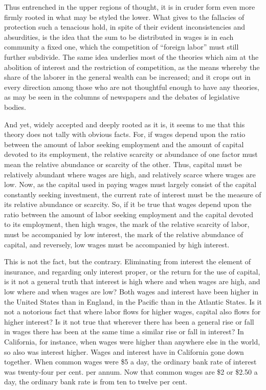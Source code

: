 Thus entrenched in the upper regions of thought, it is in cruder form
even more firmly rooted in what may be styled the lower. What gives to
the fallacies of protection such a tenacious hold, in spite of their
evident inconsistencies and absurdities, is the idea that the sum to be
distributed in wages is in each community a fixed one, which the
competition of ``foreign labor'' must still further subdivide. The same
idea underlies most of the theories which aim at the abolition of
interest and the restriction of competition, as the means whereby the
share of the laborer in the general wealth can be increased; and it
crops out in every direction among those who are not thoughtful enough
to have any theories, as may be seen in the columns of newspapers and
the debates of legislative bodies.

And yet, widely accepted and deeply rooted as it is, it seems to me that
this theory does not tally with obvious facts. For, if wages depend upon
the ratio between the amount of labor seeking employment and the amount
of capital devoted to its employment, the relative scarcity or abundance
of one factor must mean the relative abundance or scarcity of the other.
Thus, capital must be relatively abundant where wages are high, and
relatively scarce where wages are low. Now, as the capital used in
paying wages must largely consist of the capital constantly seeking
investment, the current rate of interest must be the measure of its
relative abundance or scarcity. So, if it be true that wages depend upon
the ratio between the amount of labor seeking employment and the capital
devoted to its employment, then high wages, the mark of the relative
scarcity of labor, must be accompanied by low interest, the mark of the
relative abundance of capital, and reversely, low wages must be
accompanied by high interest.

This is not the fact, but the contrary. Eliminating from interest the
element of insurance, and regarding only interest proper, or the return
for the use of capital, is it not a general truth that interest is high
where and when wages are high, and low where and when wages are low?
Both wages and interest have been higher in the United States than in
England, in the Pacific than in the Atlantic States. Is it not a
notorious fact that where labor flows for higher wages, capital also
flows for higher interest? Is it not true that wherever there has been a
general rise or fall in wages there has been at the same time a similar
rise or fall in interest? In California, for instance, when wages were
higher than anywhere else in the world, so also was interest higher.
Wages and interest have in California gone down together. When common
wages were \$5 a day, the ordinary bank rate of interest was twenty-four
per cent. per annum. Now that common wages are \$2 or \$2.50 a day, the
ordinary bank rate is from ten to twelve per cent.

